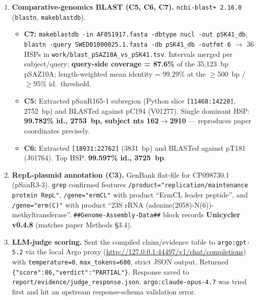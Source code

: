 \documentclass[11pt]{article}
\begin{document}
\begin{enumerate}
  \item \textbf{Comparative-genomics BLAST (C5, C6, C7).} \texttt{ncbi-blast+ 2.16.0}
        (\texttt{blastn}, \texttt{makeblastdb}).
        \begin{itemize}
          \item \textbf{C7:} \texttt{makeblastdb -in AF051917.fasta -dbtype nucl -out pSK41\_db}; \texttt{blastn -query SWED01000025.1.fasta -db pSK41\_db -outfmt 6} $\rightarrow$ 36 HSPs in \texttt{work/blast\_pSAZ10A\_vs\_pSK41.tsv}. Intervals merged per subject/query; \textbf{query-side coverage = 87.6\%} of the 35{,}123~bp pSAZ10A; length-weighted mean identity = 99.29\% at the $\geq$500~bp / $\geq$95\% id.\ threshold.
          \item \textbf{C5:} Extracted pSauR165-1 subregion (Python slice \texttt{[11468:14220]}, 2752~bp) and BLASTed against pC194 (V01277). Single dominant HSP: \textbf{99.782\% id., 2753~bp, subject nts 162$\rightarrow$2910} --- reproduces paper coordinates precisely.
          \item \textbf{C6:} Extracted \texttt{[18931:22762]} (3831~bp) and BLASTed against pT181 (J01764). Top HSP: \textbf{99.597\% id., 3725~bp}.
        \end{itemize}

  \item \textbf{RepL-plasmid annotation (C3).} GenBank flat-file for CP098730.1
        (pSauR3-3). \texttt{grep} confirmed features
        \texttt{/product="replication/maintenance protein RepL"},
        \texttt{/gene="ermCL"} with product ``ErmCL leader peptide'', and
        \texttt{/gene="erm(C)"} with product ``23S rRNA (adenine(2058)-N(6))-methyltransferase''.
        \texttt{\#\#Genome-Assembly-Data\#\#} block records
        \textbf{Unicycler v0.4.8} (matches paper Methods \S3.4).

  \item \textbf{LLM-judge scoring.} Sent the compiled claim/evidence table to
        \texttt{argo:gpt-5.2} via the local Argo proxy
        (\url{http://127.0.0.1:44497/v1/chat/completions}) with
        \texttt{temperature=0}, \texttt{max\_tokens=600}, strict JSON output.
        Returned \texttt{\{"score":86,"verdict":"PARTIAL"\}}. Response saved to
        \texttt{report/evidence/judge\_response.json}. \texttt{argo:claude-opus-4.7}
        was tried first and hit an upstream response-schema validation error.
\end{enumerate}
\end{document}
